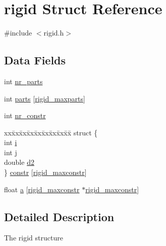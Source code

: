 \hypertarget{structrigid}{\section{rigid Struct Reference}
\label{structrigid}
}


{\ttfamily \#include $<$rigid.\-h$>$}

\subsection*{Data Fields}
\begin{DoxyCompactItemize}
\item 
int \hyperlink{structrigid_ac4dd7e5fa976280ea5c88ef8206c2d5b}{nr\-\_\-parts}
\item 
int \hyperlink{structrigid_a764d5dc0a8072ed017809e7820ae62a2}{parts} \mbox{[}\hyperlink{rigid_8h_ad0716c0e4d8dcbe289bbf7deac27da67}{rigid\-\_\-maxparts}\mbox{]}
\item 
int \hyperlink{structrigid_a3016fd6c2bac51bd377ee1f3c1d1928b}{nr\-\_\-constr}
\item 
\begin{tabbing}
xx\=xx\=xx\=xx\=xx\=xx\=xx\=xx\=xx\=\kill
struct \{\\
\>int \hyperlink{structrigid_acb559820d9ca11295b4500f179ef6392}{i}\\
\>int \hyperlink{structrigid_a37d972ae0b47b9099e30983131d31916}{j}\\
\>double \hyperlink{structrigid_a13b4e96542fec65c7a11bc18f5a5439e}{d2}\\
\} \hyperlink{structrigid_a310c461f319ef4420a817e52fc9823d0}{constr} \mbox{[}\hyperlink{rigid_8h_a81f3d75b801a59389fda651d276b2f71}{rigid\_maxconstr}\mbox{]}\\

\end{tabbing}\item 
float \hyperlink{structrigid_a99527087b873825e5207af1d1094b544}{a} \mbox{[}\hyperlink{rigid_8h_a81f3d75b801a59389fda651d276b2f71}{rigid\-\_\-maxconstr} $\ast$\hyperlink{rigid_8h_a81f3d75b801a59389fda651d276b2f71}{rigid\-\_\-maxconstr}\mbox{]}
\end{DoxyCompactItemize}


\subsection{Detailed Description}
The rigid structure 

